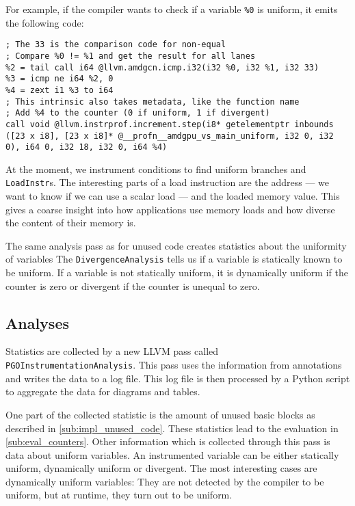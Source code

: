 For example, if the compiler wants to check if a variable \texttt{\%0} is uniform, it emits the following code:
\begin{lstlisting}[caption={Check a variable for uniformity},language={[x86masm]Assembler}]
%1 = tail call i32 @llvm.amdgcn.readfirstlane(i32 %0)
; The 33 is the comparison code for non-equal
; Compare %0 != %1 and get the result for all lanes
%2 = tail call i64 @llvm.amdgcn.icmp.i32(i32 %0, i32 %1, i32 33)
%3 = icmp ne i64 %2, 0
%4 = zext i1 %3 to i64
; This intrinsic also takes metadata, like the function name
; Add %4 to the counter (0 if uniform, 1 if divergent)
call void @llvm.instrprof.increment.step(i8* getelementptr inbounds ([23 x i8], [23 x i8]* @__profn__amdgpu_vs_main_uniform, i32 0, i32 0), i64 0, i32 18, i32 0, i64 %4)
\end{lstlisting}

At the moment, we instrument conditions to find uniform branches and \texttt{LoadInstr}s.
The interesting parts of a load instruction are the address --- we want to know if we can use a scalar load --- and the loaded memory value.
This gives a coarse insight into how applications use memory loads and how diverse the content of their memory is.

The same analysis pass as for unused code creates statistics about the uniformity of variables
The \texttt{DivergenceAnalysis} tells us if a variable is statically known to be uniform.
If a variable is not statically uniform, it is dynamically uniform if the counter is zero or divergent if the counter is unequal to zero.

\subsection{Analyses}
\label{sub:impl_analysis}
Statistics are collected by a new LLVM pass called \texttt{PGOInstrumentationAnalysis}.
This pass uses the information from annotations and writes the data to a log file.
This log file is then processed by a Python script to aggregate the data for diagrams and tables.

One part of the collected statistic is the amount of unused basic blocks as described in \cref{sub:impl_unused_code}.
These statistics lead to the evaluation in \cref{sub:eval_counters}.
Other information which is collected through this pass is data about uniform variables.
An instrumented variable can be either statically uniform, dynamically uniform or divergent.
The most interesting cases are dynamically uniform variables: They are not detected by the compiler to be uniform, but at runtime, they turn out to be uniform.

